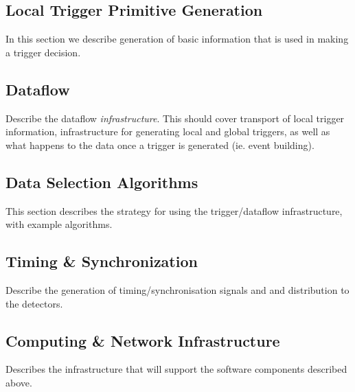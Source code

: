 \subsection{Local Trigger Primitive Generation}
\label{sec:fdsp-daq-ltr}

In this section we describe generation of basic information that is used in making a trigger decision.

\subsection{Dataflow}
\label{sec:fdsp-daq-hlt}

Describe the dataflow {\it infrastructure}. This should cover transport of local trigger information, infrastructure for generating local and global triggers, as well as what happens to the data once a trigger is generated (ie. event building). 

\subsection{Data Selection Algorithms}
\label{sec:fdsp-daq-hlt}

This section describes the strategy for using the trigger/dataflow infrastructure, with example algorithms.

%
%
%

\subsection{Timing \& Synchronization}
\label{sec:fdsp-daq-hlt}

Describe the generation of timing/synchronisation signals and and distribution to the detectors.


\subsection{Computing \& Network Infrastructure}
\label{sec:fdsp-daq-infra}

Describes the infrastructure that will support the software components described above.

